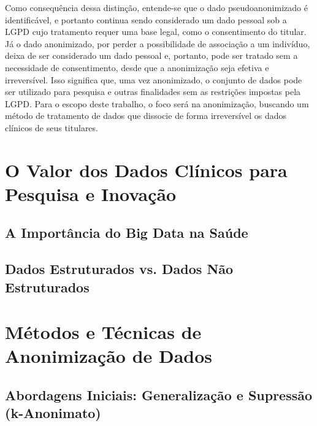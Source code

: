 Como consequência dessa distinção, entende-se que o dado pseudoanonimizado é identificável, e portanto continua sendo considerado um dado pessoal sob a LGPD cujo tratamento requer uma base legal, como o consentimento do titular. Já o dado anonimizado, por perder a possibilidade de associação a um indivíduo, deixa de ser considerado um dado pessoal e, portanto, pode ser tratado sem a necessidade de consentimento, desde que a anonimização seja efetiva e irreversível. Isso significa que, uma vez anonimizado, o conjunto de dados pode ser utilizado para pesquisa e outras finalidades sem as restrições impostas pela LGPD. Para o escopo deste trabalho, o foco será na anonimização, buscando um método de tratamento de dados que dissocie de forma irreversível os dados clínicos de seus titulares.

\section{O Valor dos Dados Clínicos para Pesquisa e Inovação}
\label{sec:fund-valor-dados}

\subsection{A Importância do Big Data na Saúde}
\label{subsec:fund-bigdata}

\subsection{Dados Estruturados vs. Dados Não Estruturados}
\label{subsec:fund-dados-estruturados}

\section{Métodos e Técnicas de Anonimização de Dados}
\label{sec:fund-metodos-anon}

\subsection{Abordagens Iniciais: Generalização e Supressão (k-Anonimato)}
\label{subsec:fund-k-anonimato}

